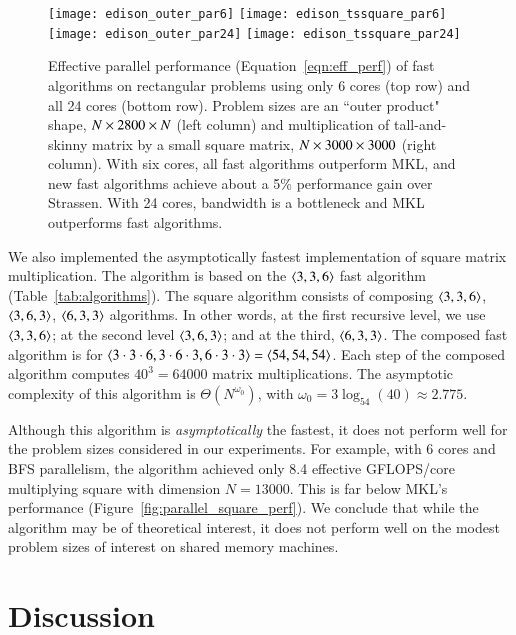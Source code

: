 \documentclass[preprint]{sigplanconf}
\begin{document}
\begin{figure*}[tb]
\centering
\texttt{[image: edison\_outer\_par6]}
\texttt{[image: edison\_tssquare\_par6]} \\
\texttt{[image: edison\_outer\_par24]}
\texttt{[image: edison\_tssquare\_par24]}
\caption{
Effective parallel performance (Equation~\eqref{eqn:eff_perf}) of fast algorithms on rectangular problems using only 6 cores (top row) and all 24 cores (bottom row).
Problem sizes are an ``outer product" shape, $N \times 2800 \times N$ (left column) and
multiplication of tall-and-skinny matrix by a small square matrix, $N \times 3000 \times 3000$ (right column).
With six cores, all fast algorithms outperform MKL, and new fast algorithms achieve about a 5\% performance gain over Strassen.
With 24 cores, bandwidth is a bottleneck and MKL outperforms fast algorithms.
}
\label{fig:parallel_nonsquare_perf}
\end{figure*}

We also implemented the asymptotically fastest implementation of square matrix multiplication.
The algorithm is based on the $\left\langle3, 3, 6\right\rangle$ fast algorithm (Table~\ref{tab:algorithms}).
The square algorithm consists of composing $\left\langle3, 3, 6\right\rangle$, $\left\langle3, 6, 3\right\rangle$, $\left\langle6, 3, 3\right\rangle$ algorithms.
In other words, at the first recursive level, we use $\left\langle3, 3, 6\right\rangle$; at the second level $\left\langle3, 6, 3\right\rangle$; and at the third, $\left\langle6, 3, 3\right\rangle$.
The composed fast algorithm is for $\left\langle3 \cdot 3 \cdot 6, 3 \cdot 6 \cdot 3, 6 \cdot 3 \cdot 3\right\rangle = \left\langle54, 54, 54\right\rangle$.
Each step of the composed algorithm computes $40^3 = 64000$ matrix multiplications.
The asymptotic complexity of this algorithm is $\Theta(N^{\omega_0})$, with $\omega_0 = 3\log_{54}(40) \approx 2.775$.

Although this algorithm is \emph{asymptotically} the fastest, it does not perform well for the problem sizes considered in our experiments.
For example, with 6 cores and BFS parallelism, the algorithm achieved only 8.4 effective GFLOPS/core multiplying square with dimension $N = 13000$.
This is far below MKL's performance (Figure~\ref{fig:parallel_square_perf}).
We conclude that while the algorithm may be of theoretical interest, it does not perform well on the modest problem sizes of interest on shared memory machines.








\section{Discussion}
\end{document}
